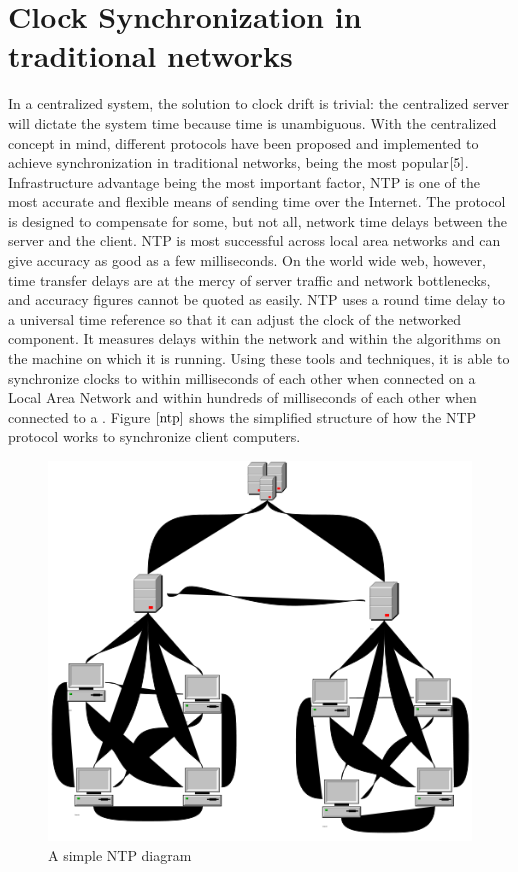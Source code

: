 \documentclass[a4paper,10pt]{report}
\begin{document}
\section{\textbf{Clock Synchronization in traditional networks}}
In a centralized system, the solution to clock drift is trivial: the centralized server will dictate the system time because time is unambiguous. With the centralized concept in mind, different protocols have been proposed and implemented to achieve synchronization in traditional networks,   being the most popular$\cite{5}$. 
\newline
Infrastructure advantage being the most important factor, NTP is one of the most accurate and flexible means of sending time over the Internet. The protocol is designed to compensate for some, but not all, network time delays between the server and the client. NTP is most successful across local area networks and can give accuracy as good as a few milliseconds. On the world wide web, however, time transfer delays are at the mercy of server traffic and network bottlenecks, and accuracy figures cannot be quoted as easily. NTP uses a round time delay to a universal time reference so that it can adjust the clock of the networked component. It measures delays within the network and within the algorithms on the machine on which it is running. Using  these tools and techniques, it is able to synchronize clocks to within milliseconds of each other when connected on a Local Area Network and within hundreds of milliseconds of each other when connected to a . Figure $\ref{ntp}$ shows the simplified structure of how the NTP protocol works to synchronize client computers.
\begin{figure}
\centering
\includegraphics[width= 0.5 \textwidth]{ntp}
\caption{A simple NTP diagram} \label{ntp}
\end{figure}
\newline
\end{document}

